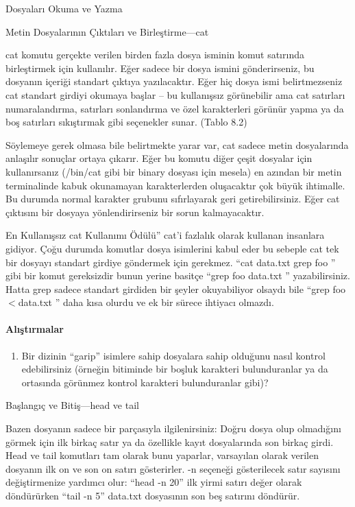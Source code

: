 \begin{section}{Dosyaları Okuma ve Yazma}
\begin{subsection}{Metin Dosyalarının Çıktıları ve Birleştirme—cat}

cat komutu gerçekte verilen birden fazla dosya isminin komut satırında birleştirmek için kullanılır. Eğer sadece bir dosya ismini gönderirseniz, bu dosyanın içeriği standart çıktıya yazılacaktır. Eğer hiç dosya ismi belirtmezseniz cat standart girdiyi okumaya başlar – bu kullanışsız görünebilir ama cat satırları numaralandırma, satırları sonlandırma ve özel karakterleri görünür yapma ya da boş satırları sıkıştırmak gibi seçenekler sunar. (Tablo 8.2)

Söylemeye gerek olmasa bile belirtmekte yarar var, cat sadece metin dosyalarında anlaşılır sonuçlar ortaya çıkarır. Eğer bu komutu diğer çeşit dosyalar için kullanırsanız (/bin/cat gibi bir binary dosyası için mesela) en azından bir metin terminalinde kabuk okunamayan karakterlerden oluşacaktır çok büyük ihtimalle. Bu durumda normal karakter grubunu sıfırlayarak geri getirebilirsiniz. Eğer cat çıktısını bir dosyaya yönlendirirseniz bir sorun kalmayacaktır.

En Kullanışsız cat Kullanımı Ödülü” cat'i fazlalık olarak kullanan insanlara gidiyor. Çoğu durumda komutlar dosya isimlerini kabul eder bu sebeple cat tek bir dosyayı standart girdiye göndermek için gerekmez. “cat data.txt \textbar grep foo ” gibi bir komut gereksizdir bunun yerine basitçe “grep foo data.txt ” yazabilirsiniz. Hatta grep sadece standart girdiden bir şeyler okuyabiliyor olsaydı bile “grep foo $<$data.txt ” daha kısa olurdu ve ek bir sürece ihtiyacı olmazdı.

\paragraph{{\Huge{\PencilLeftDown}}Alıştırmalar}{
\begin{enumerate}
 \item Bir dizinin “garip” isimlere sahip dosyalara sahip olduğunu nasıl kontrol edebilirsiniz (örneğin bitiminde bir boşluk karakteri bulunduranlar ya da ortasında görünmez kontrol karakteri bulunduranlar gibi)?
\end{enumerate}}
\end{subsection}
\begin{subsection}{Başlangıç ve Bitiş—head ve tail}

Bazen dosyanın sadece bir parçasıyla ilgilenirsiniz: Doğru dosya olup olmadığını görmek için ilk birkaç satır ya da özellikle kayıt dosyalarında son birkaç girdi. Head ve tail komutları tam olarak bunu yaparlar, varsayılan olarak verilen dosyanın ilk on ve son on satırı gösterirler. -n seçeneği gösterilecek satır sayısını değiştirmenize yardımcı olur: “head -n 20” ilk yirmi satırı değer olarak döndürürken “tail -n 5” data.txt dosyasının son beş satırını döndürür.


\end{subsection}
\end{section}
